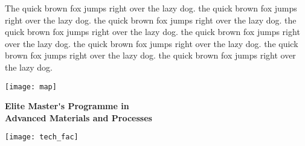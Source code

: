 \begin{titlepage}
\noindent
    \parbox{\textwidth}{%
        The quick brown fox jumps right over the lazy dog. the quick brown fox jumps right over the lazy dog. the quick brown fox jumps right over the lazy dog. the quick brown fox jumps right over the lazy dog. the quick brown fox jumps right over the lazy dog. the quick brown fox jumps right over the lazy dog. the quick brown fox jumps right over the lazy dog. the quick brown fox jumps right over the lazy dog.
    
}

\clearpage
\noindent%
\texttt{[image: map]}%
\begin{minipage}[b]{0.5\textwidth}
\centering
\textbf{Elite Master\'{}s Programme in} \\
\textbf{Advanced Materials and Processes}
\end{minipage}%
\texttt{[image: tech\_fac]}
\thispagestyle{empty}











\end{titlepage}